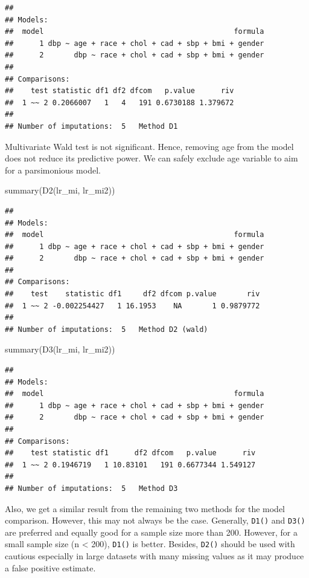 \documentclass[
  10pt,
]{krantz}
\newenvironment{Shaded}{\begin{snugshade}}{\end{snugshade}}
\newcommand{\FunctionTok}[1]{\textcolor[rgb]{0.00,0.00,0.00}{#1}}
\newcommand{\NormalTok}[1]{#1}
\begin{document}
\begin{verbatim}
## 
## Models:
##  model                                            formula
##      1 dbp ~ age + race + chol + cad + sbp + bmi + gender
##      2       dbp ~ race + chol + cad + sbp + bmi + gender
## 
## Comparisons:
##    test statistic df1 df2 dfcom   p.value      riv
##  1 ~~ 2 0.2066007   1   4   191 0.6730188 1.379672
## 
## Number of imputations:  5   Method D1
\end{verbatim}

Multivariate Wald test is not significant. Hence, removing age from the model does not reduce its predictive power. We can safely exclude age variable to aim for a parsimonious model.

\begin{Shaded}
\begin{Highlighting}[]
\FunctionTok{summary}\NormalTok{(}\FunctionTok{D2}\NormalTok{(lr\_mi, lr\_mi2))}
\end{Highlighting}
\end{Shaded}

\begin{verbatim}
## 
## Models:
##  model                                            formula
##      1 dbp ~ age + race + chol + cad + sbp + bmi + gender
##      2       dbp ~ race + chol + cad + sbp + bmi + gender
## 
## Comparisons:
##    test    statistic df1     df2 dfcom p.value       riv
##  1 ~~ 2 -0.002254427   1 16.1953    NA       1 0.9879772
## 
## Number of imputations:  5   Method D2 (wald)
\end{verbatim}

\begin{Shaded}
\begin{Highlighting}[]
\FunctionTok{summary}\NormalTok{(}\FunctionTok{D3}\NormalTok{(lr\_mi, lr\_mi2))}
\end{Highlighting}
\end{Shaded}

\begin{verbatim}
## 
## Models:
##  model                                            formula
##      1 dbp ~ age + race + chol + cad + sbp + bmi + gender
##      2       dbp ~ race + chol + cad + sbp + bmi + gender
## 
## Comparisons:
##    test statistic df1      df2 dfcom   p.value      riv
##  1 ~~ 2 0.1946719   1 10.83101   191 0.6677344 1.549127
## 
## Number of imputations:  5   Method D3
\end{verbatim}

Also, we get a similar result from the remaining two methods for the model comparison. However, this may not always be the case. Generally, \texttt{D1()} and \texttt{D3()} are preferred and equally good for a sample size more than 200. However, for a small sample size (n \textless{} 200), \texttt{D1()} is better. Besides, \texttt{D2()} should be used with cautious especially in large datasets with many missing values as it may produce a false positive estimate.
\end{document}
